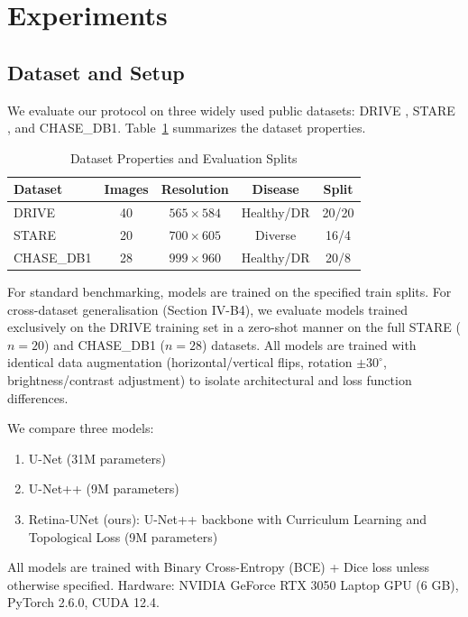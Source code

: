 \documentclass[conference]{IEEEtran}
\begin{document}
\section{Experiments}
\subsection{Dataset and Setup}
We evaluate our protocol on three widely used public datasets: DRIVE \cite{staal2004ridge}, STARE \cite{hoover2000locating}, and CHASE\_DB1. Table~\ref{tab:datasets} summarizes the dataset properties.

\begin{table}[htbp]
\caption{Dataset Properties and Evaluation Splits}
\label{tab:datasets}
\centering
\begin{tabular}{lcccc}
\toprule
\textbf{Dataset} & \textbf{Images} & \textbf{Resolution} & \textbf{Disease} & \textbf{Split} \\
\midrule
DRIVE & 40 & $565 \times 584$ & Healthy/DR & 20/20 \\
STARE & 20 & $700 \times 605$ & Diverse & 16/4 \\
CHASE\_DB1 & 28 & $999 \times 960$ & Healthy/DR & 20/8 \\
\bottomrule
\end{tabular}
\end{table}

For standard benchmarking, models are trained on the specified train splits. For cross-dataset generalisation (Section IV-B4), we evaluate models trained exclusively on the DRIVE training set in a zero-shot manner on the full STARE ($n=20$) and CHASE\_DB1 ($n=28$) datasets. All models are trained with identical data augmentation (horizontal/vertical flips, rotation $\pm 30^\circ$, brightness/contrast adjustment) to isolate architectural and loss function differences.

We compare three models:
\begin{enumerate}
    \item U-Net \cite{ronneberger2015unet} (31M parameters)
    \item U-Net++ \cite{zhou2018unet++} (9M parameters)
    \item Retina-UNet (ours): U-Net++ backbone with Curriculum Learning and Topological Loss (9M parameters)
\end{enumerate}
All models are trained with Binary Cross-Entropy (BCE) + Dice loss unless otherwise specified. Hardware: NVIDIA GeForce RTX 3050 Laptop GPU (6 GB), PyTorch 2.6.0, CUDA 12.4.
\end{document}
